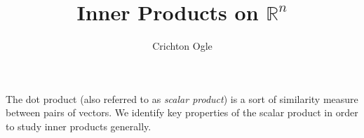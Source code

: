 \documentclass{ximera}
\title{Inner Products on $\mathbb R^n$}
\author{Crichton Ogle}
\begin{document}
\begin{abstract}
\end{abstract}
\maketitle

The dot product (also referred to as {\it scalar product}) is a sort
of similarity measure between pairs of vectors.  We identify key
properties of the scalar product in order to study inner products
generally.
\end{document}
